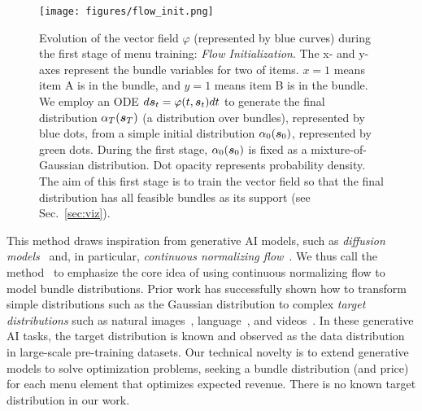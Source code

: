\begin{figure}
    \centering
    \texttt{[image: figures/flow\_init.png]}
    \caption{Evolution of the vector field $\varphi$ (represented by blue curves) during the first stage of menu training: \emph{Flow Initialization}. The x- and y-axes represent the bundle variables for two of items. $x=1$ means item A is in the bundle, and $y=1$ means item B is in the bundle. We employ an ODE $d{\bm{s}}_t = \varphi(t, {\bm{s}}_t) dt$ to generate the final distribution $\alpha_T({\bm{s}}_T)$ (a distribution over bundles), represented by blue dots, from a simple initial distribution $\alpha_0({\bm{s}}_0)$, represented by green dots. During the first stage, $\alpha_0({\bm{s}}_0)$ is fixed as a mixture-of-Gaussian distribution. Dot opacity represents probability density. The aim of this first stage is to train the vector field so that the final distribution has all feasible bundles as its support (see Sec.~\ref{sec:viz}).
    \label{fig:flow_init}}
\end{figure}
This method draws inspiration from generative AI models, such as {\em diffusion models}~\cite{ho2020denoising, kadkhodaie2023generalization,song2021score,song2019generative,yang2025policy} and, in particular, {\em continuous normalizing flow}~\cite{chen2018neural,liu2022flow,lipman2022flow}.  We thus call the  method \name~to emphasize the core idea of using continuous normalizing flow to model bundle distributions. Prior work has successfully shown how to transform simple distributions such as the Gaussian distribution to complex \emph{target distributions} such as natural images~\cite{rombach2022high,esser2024scaling}, language~\cite{lou2024discrete}, and videos~\cite{stabilityAI2023}. In these generative AI tasks, the target distribution is known and observed as the data distribution in large-scale pre-training datasets. Our technical novelty is to extend generative models to solve optimization problems, seeking a bundle distribution (and price) for
each menu element that optimizes expected revenue. 
There is no known target distribution in our work.



